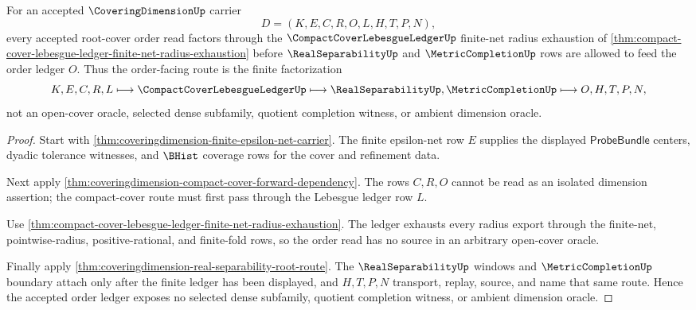 \begin{theorem}
\label{thm:coveringdimension-root-cover-ledger-factorization}
For an accepted $\CoveringDimensionUp$ carrier
$$
D=(K,E,C,R,O,L,H,T,P,N),
$$
every accepted root-cover order read factors through the $\CompactCoverLebesgueLedgerUp$ finite-net radius exhaustion of \autoref{thm:compact-cover-lebesgue-ledger-finite-net-radius-exhaustion} before $\RealSeparabilityUp$ and $\MetricCompletionUp$ rows are allowed to feed the order ledger $O$. Thus the order-facing route is the finite factorization
$$
K,E,C,R,L \longmapsto \CompactCoverLebesgueLedgerUp \longmapsto \RealSeparabilityUp,\MetricCompletionUp \longmapsto O,H,T,P,N,
$$
not an open-cover oracle, selected dense subfamily, quotient completion witness, or ambient dimension oracle.
\end{theorem}
\begin{proof}
Start with \autoref{thm:coveringdimension-finite-epsilon-net-carrier}. The finite epsilon-net row $E$ supplies the displayed $\mathsf{ProbeBundle}$ centers, dyadic tolerance witnesses, and $\BHist$ coverage rows for the cover and refinement data.

Next apply \autoref{thm:coveringdimension-compact-cover-forward-dependency}. The rows $C,R,O$ cannot be read as an isolated dimension assertion; the compact-cover route must first pass through the Lebesgue ledger row $L$.

Use \autoref{thm:compact-cover-lebesgue-ledger-finite-net-radius-exhaustion}. The ledger exhausts every radius export through the finite-net, pointwise-radius, positive-rational, and finite-fold rows, so the order read has no source in an arbitrary open-cover oracle.

Finally apply \autoref{thm:coveringdimension-real-separability-root-route}. The $\RealSeparabilityUp$ windows and $\MetricCompletionUp$ boundary attach only after the finite ledger has been displayed, and $H,T,P,N$ transport, replay, source, and name that same route. Hence the accepted order ledger exposes no selected dense subfamily, quotient completion witness, or ambient dimension oracle.
\end{proof}

